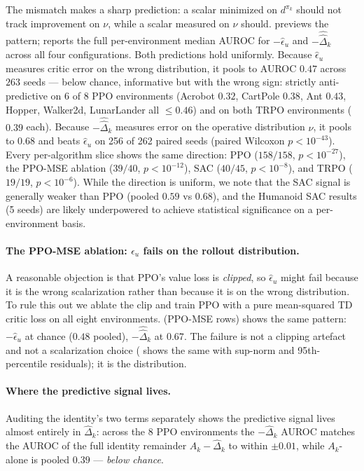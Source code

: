 \documentclass{article}
\begin{document}
The mismatch makes a sharp prediction: a scalar minimized on $d^{\pi_k}$ should not track improvement on $\nu$, while a scalar measured on $\nu$ should.  previews the pattern;  reports the full per-environment median AUROC for $-\widehat\epsilon_u$ and $-\widehat{\hat\Delta}_k$ across all four configurations. Both predictions hold uniformly. Because $\widehat\epsilon_u$ measures critic error on the wrong distribution, it pools to AUROC $0.47$ across $263$ seeds --- below chance, informative but with the wrong sign: strictly anti-predictive on $6$ of $8$ PPO environments (Acrobot $0.32$, CartPole $0.38$, Ant $0.43$, Hopper, Walker2d, LunarLander all $\le 0.46$) and on both TRPO environments ($0.39$ each). Because $-\widehat{\hat\Delta}_k$ measures error on the operative distribution $\nu$, it pools to $0.68$ and beats $\widehat\epsilon_u$ on 256 of 262 paired seeds (paired Wilcoxon $p < 10^{-43}$). Every per-algorithm slice shows the same direction: PPO ($158/158$, $p < 10^{-27}$), the PPO-MSE ablation ($39/40$, $p < 10^{-12}$), SAC ($40/45$, $p < 10^{-8}$), and TRPO ($19/19$, $p < 10^{-6}$). While the direction is uniform, we note that the SAC signal is generally weaker than PPO (pooled $0.59$ vs $0.68$), and the Humanoid SAC results (5 seeds) are likely underpowered to achieve statistical significance on a per-environment basis.



\paragraph{The PPO-MSE ablation: $\epsilon_u$ fails on the rollout distribution.}
A reasonable objection is that PPO's value loss is \emph{clipped}, so $\widehat\epsilon_u$ might fail because it is the wrong scalarization rather than because it is on the wrong distribution. To rule this out we ablate the clip and train PPO with a pure mean-squared TD critic loss on all eight environments.  (PPO-MSE rows) shows the same pattern: $-\widehat\epsilon_u$ at chance ($0.48$ pooled), $-\widehat{\hat\Delta}_k$ at $0.67$. The failure is not a clipping artefact and not a scalarization choice ( shows the same with sup-norm and 95th-percentile residuals); it is the distribution.

\paragraph{Where the predictive signal lives.}
Auditing the identity's two terms separately shows the predictive signal lives almost entirely in $\hat\Delta_k$: across the 8 PPO environments the $-\hat\Delta_k$ AUROC matches the AUROC of the full identity remainder $A_k - \hat\Delta_k$ to within $\pm 0.01$, while $A_k$-alone is pooled $0.39$ --- \emph{below chance}.
\end{document}
